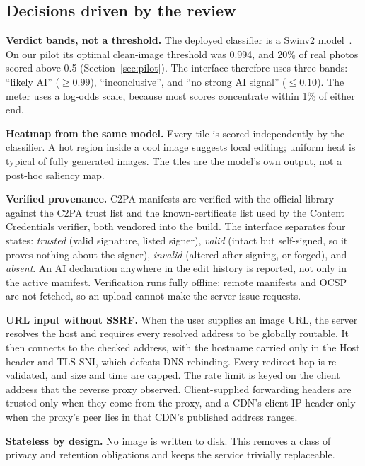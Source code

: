 \documentclass[conference]{IEEEtran}
\begin{document}
\subsection{Decisions driven by the review}
\textbf{Verdict bands, not a threshold.} The deployed classifier is a Swinv2
model~\cite{liu2022swinv2,haywoodsloan2024aidetector}. On our pilot its
optimal clean-image threshold was 0.994, and 20\% of real photos scored above
0.5 (Section~\ref{sec:pilot}). The interface therefore uses three bands:
``likely AI'' ($\ge 0.99$), ``inconclusive'', and ``no strong AI signal''
($\le 0.10$). The meter uses a log-odds scale, because most scores
concentrate within 1\% of either end.

\textbf{Heatmap from the same model.} Every tile is scored independently by
the classifier. A hot region inside a cool image suggests local editing;
uniform heat is typical of fully generated images. The tiles are the
model's own output, not a post-hoc saliency map.

\textbf{Verified provenance.} C2PA manifests are verified with the official
library against the C2PA trust list and the known-certificate list used by
the Content Credentials verifier, both vendored into the build. The
interface separates four states: \emph{trusted} (valid signature, listed
signer), \emph{valid} (intact but self-signed, so it proves nothing about
the signer), \emph{invalid} (altered after signing, or forged), and
\emph{absent}. An AI declaration anywhere in the edit history is reported,
not only in the active manifest. Verification runs fully offline: remote
manifests and OCSP are not fetched, so an upload cannot make the server
issue requests.

\textbf{URL input without SSRF.} When the user supplies an image URL, the
server resolves the host and requires every resolved address to be globally
routable. It then connects to the checked address, with the hostname carried
only in the Host header and TLS SNI, which defeats DNS rebinding. Every
redirect hop is re-validated, and size and time are capped. The rate limit
is keyed on the client address that the reverse proxy observed.
Client-supplied forwarding headers are trusted only when they come from the
proxy, and a CDN's client-IP header only when the proxy's peer lies in that
CDN's published address ranges.

\textbf{Stateless by design.} No image is written to disk. This removes a
class of privacy and retention obligations and keeps the service trivially
replaceable.
\end{document}
